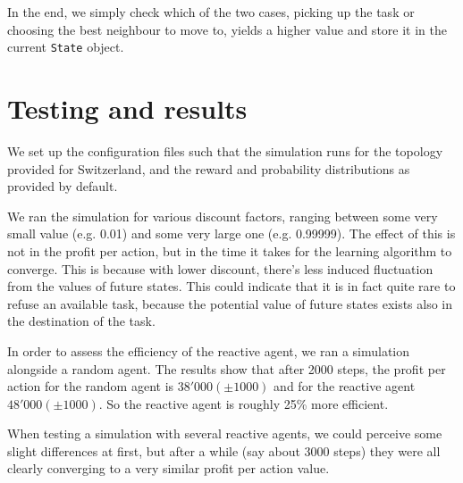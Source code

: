 \documentclass[12pt,a4paper]{article}
\begin{document}
In the end, we simply check which of the two cases, picking up the task or choosing the best neighbour to move to, yields a higher value and store it in the current \texttt{State} object.

\section{Testing and results}
We set up the configuration files such that the simulation runs for the topology provided for Switzerland, and the reward and probability distributions as provided by default. 

We ran the simulation for various discount factors, ranging between some very small value (e.g. 0.01) and some very large one (e.g. 0.99999). The effect of this is not in the profit per action, but in the time it takes for the learning algorithm to converge. This is because with lower discount, there's less induced fluctuation from the values of future states. This could indicate that it is in fact quite rare to refuse an available task, because the potential value of future states exists also in the destination of the task.

In order to assess the efficiency of the reactive agent, we ran a simulation alongside a random agent. The results show that after 2000 steps, the profit per action for the random agent is $38'000 (\pm 1000)$ and for the reactive agent $48'000 (\pm 1000)$. So the reactive agent is roughly 25\% more efficient.

When testing a simulation with several reactive agents, we could perceive some slight differences at first, but after a while (say about 3000 steps) they were all clearly converging to a very similar profit per action value.
\end{document}
